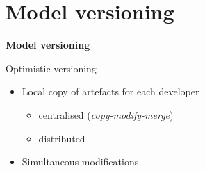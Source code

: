 \documentclass[dvips,slidetop,mathserif,red]{beamer}
\begin{document}
\section{Model versioning}

\begin{frame}{}
  \begin{center}
    \begin{Huge}
      \textbf{Model versioning}
    \end{Huge}
  \end{center}
\end{frame}


\begin{frame}{Optimistic versioning}
  \begin{itemize}
    \item Local copy of artefacts for each developer
    \begin{itemize}
      \item centralised (\emph{copy-modify-merge})
      \item distributed
    \end{itemize}
    \item Simultaneous modifications
  \end{itemize}
\end{frame}
\end{document}
